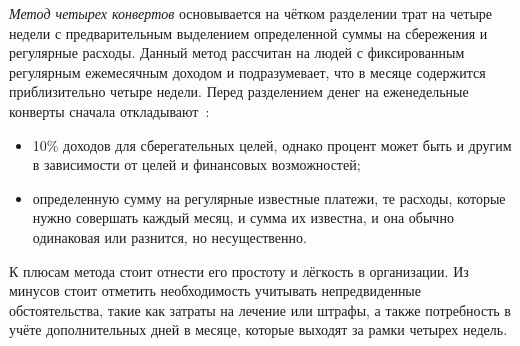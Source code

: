 \emph{Метод четырех конвертов} основывается на чётком разделении трат на четыре недели с предварительным выделением определенной суммы на сбережения и регулярные расходы.
Данный метод рассчитан на людей с фиксированным регулярным ежемесячным доходом и подразумевает, что в месяце содержится приблизительно четыре недели.
Перед разделением денег на еженедельные конверты сначала откладывают~\cite{four_envelope_rule}:
\begin{itemize}
    \item 10\% доходов для сберегательных целей, однако процент может быть и другим в зависимости от целей и финансовых возможностей;
    \item определенную сумму на регулярные известные платежи, те расходы, которые нужно совершать каждый месяц, и сумма их известна, и она обычно одинаковая или разнится, но несущественно.
\end{itemize}

К плюсам метода стоит отнести его простоту и лёгкость в организации.
Из минусов стоит отметить необходимость учитывать непредвиденные обстоятельства, такие как затраты на лечение или штрафы, а также потребность в учёте дополнительных дней в месяце, которые выходят за рамки четырех недель.

